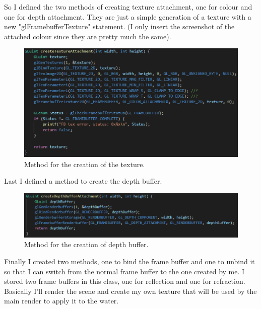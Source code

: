 \noindent
So I defined the two methods of creating texture attachment, one for colour and one for depth attachment. They are just a simple generation of a texture with a new "glFramebufferTexture" statement. (I only insert the screenshot of the attached colour since they are pretty much the same).

\begin{figure}[hbt!]
	\centering
	\includegraphics[width= 0.9
	\textwidth]{images/FBO2.png}
	\caption{Method for the creation of the texture.}
\end{figure} 

Last I defined a method to create the depth buffer. 

\begin{figure}[hbt!]
	\centering
	\includegraphics[width= 1
	\textwidth]{images/FBO4.png}
	\caption{Method for the creation of depth buffer.}
\end{figure} 

\noindent
Finally I created two methods, one to bind the frame buffer and one to unbind it so that I can switch from the normal frame buffer to the one created by me. I stored two frame buffers in this class, one for reflection and one for refraction. Basically I'll render the scene and create my own texture that will be used by the main render to apply it to the water.

